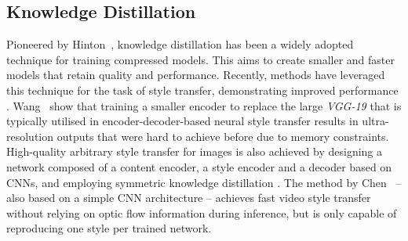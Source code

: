 \subsection{Knowledge Distillation}
Pioneered by Hinton~\etal {}, knowledge distillation has been a widely adopted technique for training compressed models. This aims to create smaller and faster models that retain quality and performance. Recently, methods have leveraged this technique for the task of style transfer, demonstrating improved performance \cite{wang2020collaborative,chen2020optical,chen2023kbstyle}. Wang~\etal {} show that training a smaller encoder to replace the large \textit{VGG-19} \cite{simonyan2015deep} that is typically utilised in encoder-decoder-based neural style transfer results in ultra-resolution outputs that were hard to achieve before due to memory constraints. High-quality arbitrary style transfer for images is also achieved by designing a network composed of a content encoder, a style encoder and a decoder based on CNNs, and employing symmetric knowledge distillation \cite{chen2023kbstyle}. The method by Chen~\etal {} -- also based on a simple CNN architecture -- achieves fast video style transfer without relying on optic flow information during inference, but is only capable of reproducing one style per trained network.